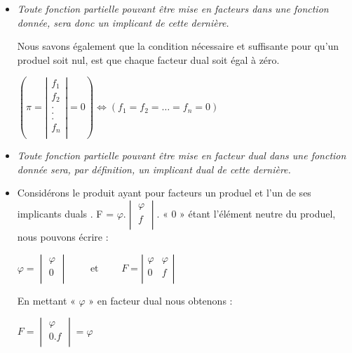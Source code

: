 \begin{itemize}
\item \emph{Toute fonction partielle pouvant être mise en facteurs dans une fonction donnée, sera donc un implicant de cette dernière.}

Nous savons également que la condition nécessaire et suffisante pour qu'un produel soit nul, est que chaque facteur dual soit égal à zéro.



$ \left( \pi = \left| \begin{array}{c} 
                f_1 \\ f_2 \\ . \\ . \\ . \\ f_n\\
                          \end{array}
                    \right| = 0 
  \right) \Longleftrightarrow (f_1 = f_2 = \ldots = f_n = 0 )  
$ 

\item \emph {Toute fonction partielle pouvant être mise en facteur dual dans une fonction donnée sera,  par définition, un implicant dual de cette dernière.
}

\item Considérons le produit ayant pour facteurs un produel et l'un de ses implicants duals . F = $\varphi . \begin{vmatrix} \varphi \\ f \\ \end{vmatrix} $. « $0$ » étant l'élément neutre du produel, nous pouvons écrire : 

\centerline { $\varphi = \begin{vmatrix} \varphi \\ 0 \\ \end{vmatrix} \qquad \text{ et }  \qquad 
F =  \left| \begin{array}{c|c} \varphi & \varphi \\ 0 & f \\
\end{array} \right|$   
} 

En mettant « $\varphi$ » en facteur dual nous obtenons : 

\centerline{
$F = \begin{vmatrix} \varphi \\ 0 . f \\ \end{vmatrix} = \varphi $ 
}


\end{itemize}
